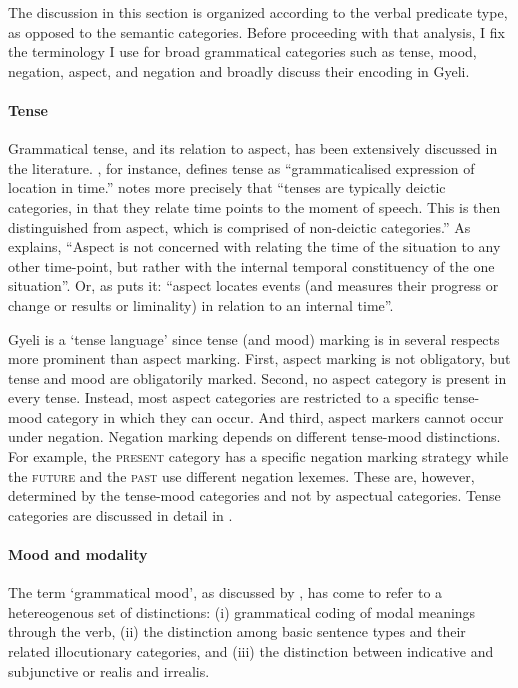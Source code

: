 The discussion in this section is organized according to the verbal predicate type, as opposed to the semantic categories. Before proceeding with that analysis, I fix the terminology I use for broad grammatical categories such as tense, mood, negation, aspect, and negation and broadly discuss their encoding in Gyeli. 


\paragraph{Tense}
Grammatical tense, and its relation to aspect, has been extensively discussed in the literature.
\citet[9]{comrie85}, for instance, defines tense as ``grammaticalised expression of location in time.'' \citet[25]{dahl85} notes more precisely that ``tenses are typically deictic categories, in that they relate time points to the moment of speech. This is then distinguished from aspect, which is comprised of non-deictic categories.'' As \citet[5]{comrie76} explains, ``Aspect is not concerned with relating the time of the situation to any other time-point, but rather with the internal temporal constituency of the one situation''. Or, as \citet[315]{timberlake2007} puts it: ``aspect locates events (and measures their progress or change or results or liminality) in relation to an internal time''. 

Gyeli is  a `tense language' since tense (and mood) marking is in several respects more prominent than aspect marking. First, aspect marking is not obligatory, but tense and mood are obligatorily marked. Second, no aspect category is present in  every tense. Instead, most aspect categories are restricted to a specific tense-mood category in which they can occur. And third, aspect markers cannot occur under negation. Negation marking depends on different tense-mood distinctions. For example, the \textsc{present} category has a specific negation marking strategy while the \textsc{future} and the \textsc{past} use different negation lexemes. These are, however, determined by the tense-mood categories and not by aspectual categories. Tense categories are discussed in detail in .


\paragraph{Mood and modality}  The term `grammatical mood', as discussed by \citet{nuyts2016}, has come to refer to a hetereogenous set of distinctions: (i)  grammatical coding of modal meanings through the verb, (ii) the distinction among  basic sentence types and their related illocutionary categories, and (iii) the distinction between indicative and subjunctive or realis and irrealis. 

